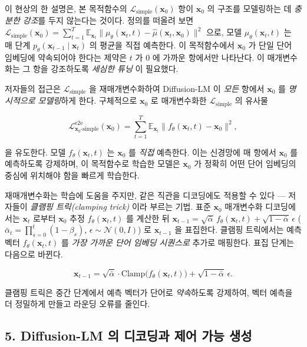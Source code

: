 \documentclass[
]{article}
\begin{document}
이 현상의 한 설명은, 본 목적함수의
\(\mathcal{L}_\text{simple}(\mathbf{x}_0)\) 항이 \(\mathbf{x}_0\) 의
구조를 모델링하는 데 \emph{충분한 강조}를 두지 않는다는 것이다. 정의를
떠올려 보면
\(\mathcal{L}_\text{simple}(\mathbf{x}_0) = \sum_{t=1}^{T} \mathbb{E}_{\mathbf{x}_t} \|\mu_\theta(\mathbf{x}_t, t) - \hat\mu(\mathbf{x}_t, \mathbf{x}_0)\|^2\)
으로, 모델 \(\mu_\theta(\mathbf{x}_t, t)\) 는 매 단계
\(p_\theta(\mathbf{x}_{t-1} \mid \mathbf{x}_t)\) 의 평균을 직접
예측한다. 이 목적함수에서 \(\mathbf{x}_0\) 가 단일 단어 임베딩에
약속되어야 한다는 제약은 \(t\) 가 0 에 가까운 항에서만 나타난다. 이
매개변수화는 그 항을 강조하도록 \emph{세심한 튜닝} 이 필요했다.

저자들의 접근은 \(\mathcal{L}_\text{simple}\) 을 재매개변수화하여
Diffusion-LM 이 \emph{모든} 항에서 \(\mathbf{x}_0\) 를 \emph{명시적으로
모델링}하게 한다. 구체적으로 \(\mathbf{x}_0\) 로 매개변수화한
\(\mathcal{L}_\text{simple}\) 의 유사물

\[
\mathcal{L}^\text{e2e}_{\mathbf{x}_0\text{-simple}}(\mathbf{x}_0) = \sum_{t=1}^{T} \mathbb{E}_{\mathbf{x}_t} \big\| f_\theta(\mathbf{x}_t, t) - \mathbf{x}_0 \big\|^2,
\]

을 유도한다. 모델 \(f_\theta(\mathbf{x}_t, t)\) 는 \(\mathbf{x}_0\) 를
\emph{직접} 예측한다. 이는 신경망에 매 항에서 \(\mathbf{x}_0\) 를
예측하도록 강제하며, 이 목적함수로 학습한 모델은 \(\mathbf{x}_0\) 가
정확히 어떤 단어 임베딩의 중심에 위치해야 함을 빠르게 학습한다.

재매개변수화는 학습에 도움을 주지만, 같은 직관을 디코딩에도 적용할 수
있다 --- 저자들이 \emph{클램핑 트릭(clamping trick)} 이라 부르는 기법.
표준 \(\mathbf{x}_0\) 매개변수화 디코딩에서는 \(\mathbf{x}_t\) 로부터
\(\mathbf{x}_0\) 추정 \(f_\theta(\mathbf{x}_t, t)\) 를 계산한 뒤
\(\mathbf{x}_{t-1} = \sqrt{\bar\alpha}\, f_\theta(\mathbf{x}_t, t) + \sqrt{1-\bar\alpha}\,\epsilon\)
(\(\bar\alpha_t = \prod_{s=0}^{t}(1-\beta_s)\),
\(\epsilon \sim \mathcal{N}(0, I)\)) 로 \(\mathbf{x}_{t-1}\) 을
표집한다. 클램핑 트릭에서는 예측 벡터 \(f_\theta(\mathbf{x}_t, t)\) 를
\emph{가장 가까운 단어 임베딩 시퀀스로} 추가로 매핑한다. 표집 단계는
다음으로 바뀐다.

\[
\mathbf{x}_{t-1} = \sqrt{\bar\alpha}\cdot \mathrm{Clamp}\big(f_\theta(\mathbf{x}_t, t)\big) + \sqrt{1-\bar\alpha}\,\epsilon.
\]

클램핑 트릭은 중간 단계에서 예측 벡터가 단어로 \emph{약속}하도록
강제하여, 벡터 예측을 더 정밀하게 만들고 라운딩 오류를 줄인다.

\hypertarget{diffusion-lm-uxc758-uxb514uxcf54uxb529uxacfc-uxc81cuxc5b4-uxac00uxb2a5-uxc0dduxc131}{%
\subsection{5. Diffusion-LM 의 디코딩과 제어 가능
생성}\label{diffusion-lm-uxc758-uxb514uxcf54uxb529uxacfc-uxc81cuxc5b4-uxac00uxb2a5-uxc0dduxc131}}
\end{document}
